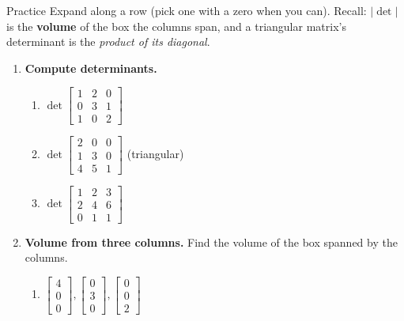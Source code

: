 \documentclass[10pt]{article}
\begin{document}
\namedateperiod

\vspace{0.12in}

\begin{notesbox}{Practice}
Expand along a row (pick one with a zero when you can). Recall: $|\det|$ is the \textbf{volume} of the
box the columns span, and a triangular matrix's determinant is the \emph{product of its diagonal}.

\begin{enumerate}[leftmargin=1.9em, itemsep=11pt]
  \item \textbf{Compute determinants.}
    \begin{enumerate}[label=(\alph*), leftmargin=1.8em, itemsep=5pt]
      \item $\det\begin{bmatrix} 1 & 2 & 0 \\ 0 & 3 & 1 \\ 1 & 0 & 2 \end{bmatrix}$ \hfill {}
      \item $\det\begin{bmatrix} 2 & 0 & 0 \\ 1 & 3 & 0 \\ 4 & 5 & 1 \end{bmatrix}$ \; {\footnotesize(triangular)} \hfill {}
      \item $\det\begin{bmatrix} 1 & 2 & 3 \\ 2 & 4 & 6 \\ 0 & 1 & 1 \end{bmatrix}$ \hfill {}
    \end{enumerate}
  \item \textbf{Volume from three columns.} Find the volume of the box spanned by the columns.
    \begin{enumerate}[label=(\alph*), leftmargin=1.8em, itemsep=5pt]
      \item $\begin{bmatrix} 4 \\ 0 \\ 0 \end{bmatrix}, \begin{bmatrix} 0 \\ 3 \\ 0 \end{bmatrix}, \begin{bmatrix} 0 \\ 0 \\ 2 \end{bmatrix}$ \hfill {}

\end{enumerate}
\end{enumerate}
\end{notesbox}
\end{document}
